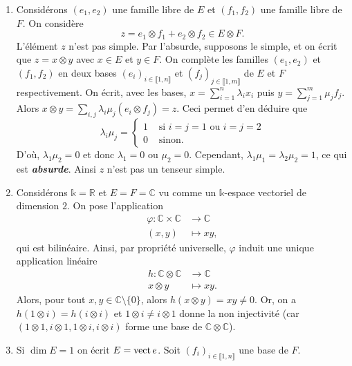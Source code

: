 \documentclass[./main]{subfiles}
\begin{document}
  \begin{enumerate}
    \item Considérons $(e_1, e_2)$ une famille libre de $E$ et $(f_1, f_2)$ une famille libre de $F$.
      On considère \[
      z = e_1 \otimes f_1 + e_2 \otimes f_2 \in E \otimes F
      .\]
      L'élément $z$ n'est pas simple.
      Par l'absurde, supposons le simple, et on écrit que $z = x \otimes y$ avec $x \in E$ et $y \in F$.
      On complète les familles $(e_1, e_2)$ et $(f_1, f_2)$ en deux bases $(e_i)_{i \in \llbracket 1,n\rrbracket  }$ et $(f_j)_{j \in \llbracket 1,m\rrbracket}$ de $E$ et $F$ respectivement.
      On écrit, avec les bases, $x = \sum_{i=1}^n \lambda_i x_i$ puis $y = \sum_{j=1}^m \mu_j f_j$.
      Alors $x \otimes y = \sum_{i,j} \lambda_i \mu_j(e_i \otimes f_j) = z$.
      Ceci permet d'en déduire que \[
      \lambda_i \mu_j = \begin{cases}
        1 &\text{ si } i = j = 1 \text{ ou } i = j = 2\\
        0 & \text{ sinon}.
      \end{cases}
      \] 
      D'où, $\lambda_1 \mu_2 = 0$ et donc  $\lambda_1 = 0$ ou  $\mu_2 = 0$.
      Cependant,  $\lambda_1 \mu_1 = \lambda_2 \mu_2 = 1$, ce qui est  \textit{\textbf{absurde}}.
      Ainsi $z$ n'est pas un tenseur simple.
    \item Considérons $\mathds{k} = \mathds{R}$ et $E = F = \mathds{C}$ vu comme un $\mathds{k}$-espace vectoriel de dimension $2$.
      On pose l'application \begin{align*}
        \varphi: \mathds{C}\times \mathds{C} &\longrightarrow \mathds{C} \\
        (x,y) &\longmapsto xy
      ,\end{align*}
      qui est bilinéaire.
      Ainsi, par propriété universelle, $\varphi$ induit une unique application linéaire \begin{align*}
        h: \mathds{C}\otimes \mathds{C} &\longrightarrow \mathds{C} \\
        x \otimes y &\longmapsto xy
      .\end{align*}
      Alors, pour tout $x, y \in \mathds{C} \setminus \{0\}$, alors $h(x \otimes y) = x y \neq 0$.
      Or, on a  $h(1 \otimes i) = h(i \otimes i)$ et  $1 \otimes i \neq i \otimes 1$ donne la non injectivité (car $(1 \otimes 1, i \otimes 1, 1 \otimes i, i \otimes i)$ forme une base de  $\mathds{C} \otimes \mathds{C}$).
    \item Si $\dim E = 1$ on écrit  $E = \operatorname{vect} e$.
      Soit $(f_i)_{i \in \llbracket 1,n\rrbracket}$ une base de $F$.

\end{enumerate}
\end{document}
